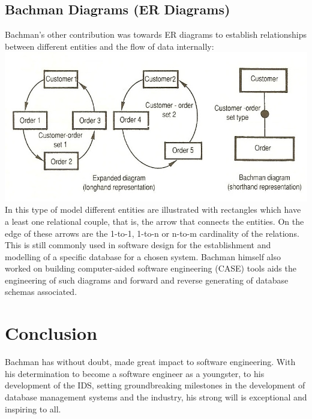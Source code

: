 \documentclass[a4paper]{article}
\begin{document}
\subsection{Bachman Diagrams (ER Diagrams)}
Bachman's other contribution was towards ER diagrams to establish relationships between different entities and the flow of data internally:
\bigbreak
\includegraphics[scale=0.5]{Bachman_diagram.jpg}\cite{dig}
\bigbreak
In this type of model different entities are illustrated with rectangles which have a least one relational couple, that is, the arrow that connects the entities. On the edge of these arrows are the 1-to-1, 1-to-n or n-to-m cardinality of the relations.
\bigbreak
This is still commonly used in software design for the establishment and modelling of a specific database for a chosen system. Bachman himself also worked on building computer-aided software engineering (CASE) tools aids the engineering of such diagrams and forward and reverse generating of database schemas associated.
\section{Conclusion}
Bachman has without doubt, made great impact to  software engineering. With his determination to become a software engineer as a youngster, to his development of the IDS, setting groundbreaking milestones in the development of database management systems and the industry, his strong will is exceptional and inspiring to all.



\end{document}
